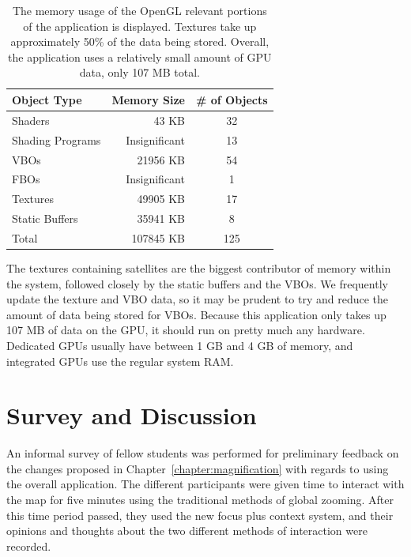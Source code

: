 \begin{table}[htp]
    \caption[Memory Usage]{The memory usage of the OpenGL relevant portions of the application is displayed. Textures take up approximately 50\% of the data being stored. Overall, the application uses a relatively small amount of GPU data, only 107 MB total.}
    \label{table:memory}
    \begin{center}
        \begin{tabular}[H]{l | r | c}
            Object Type     & Memory Size   & \# of Objects \\
            \hline
            Shaders         & 43 KB         & 32  \\
            Shading Programs& Insignificant & 13  \\
            VBOs            & 21956 KB      & 54  \\
            FBOs            & Insignificant & 1   \\
            Textures        & 49905 KB      & 17  \\
            Static Buffers  & 35941 KB      & 8   \\
            \hline
            Total           & 107845 KB     & 125 \\
        \end{tabular}
    \end{center}
\end{table}

The textures containing satellites are the biggest contributor of memory within the system, followed closely by the static buffers and the VBOs. We frequently update the texture and VBO data, so it may be prudent to try and reduce the amount of data being stored for VBOs. Because this application only takes up 107 MB of data on the GPU, it should run on pretty much any hardware. Dedicated GPUs usually have between 1 GB and 4 GB of memory, and integrated GPUs use the regular system RAM.

\section{Survey and Discussion}
\label{section:user_survey}

An informal survey of fellow students was performed for preliminary feedback on the changes proposed in Chapter~\ref{chapter:magnification} with regards to using the overall application. The different participants were given time to interact with the map for five minutes using the traditional methods of global zooming. After this time period passed, they used the new focus plus context system, and their opinions and thoughts about the two different methods of interaction were
recorded.

